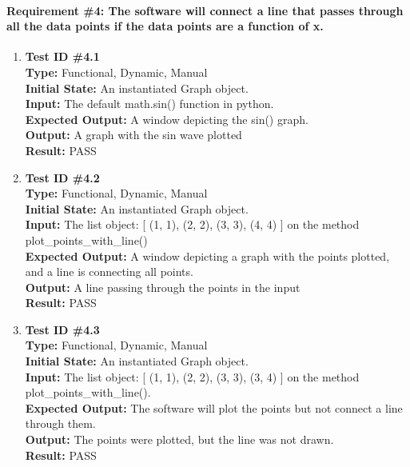 \documentclass[12pt, titlepage]{article}
\begin{document}
	\paragraph{Requirement \#4: The software will connect a line that passes through all the data points if the data points are a function of x.}
		\begin{enumerate}
			\item{\textbf{Test ID \#4.1\\}}
			\textbf{Type:} Functional, Dynamic, Manual\\
			\textbf{Initial State:} An instantiated Graph object. \\
			\textbf{Input:} The default math.sin() function in python.\\
			\textbf{Expected Output:}  A window depicting the sin() graph.\\
			\textbf{Output:}	A graph with the sin wave plotted\\
			\textbf{Result:} PASS
					
			\item{\textbf{Test ID \#4.2\\}}
			\textbf{Type:} Functional, Dynamic, Manual\\
			\textbf{Initial State:} An instantiated Graph object.\\
			\textbf{Input:} The list object: [ (1, 1),  (2, 2), (3, 3), (4, 4) ] on the method plot\_points\_with\_line()\\
			\textbf{Expected Output:} A window depicting a graph with the points plotted, and a line is connecting all points. \\
			\textbf{Output:}	A line passing through the points in the input\\
			\textbf{Result:} PASS
				
			\item{\textbf{Test ID \#4.3\\}}
			\textbf{Type:} Functional, Dynamic, Manual\\
			\textbf{Initial State:}  An instantiated Graph object.\\
			\textbf{Input:} The list object: [ (1, 1),  (2, 2), (3, 3), (3, 4) ] on the method plot\_points\_with\_line().\\
			\textbf{Expected Output:} The software will plot the points but not connect a line through them.\\
			\textbf{Output:}	The points were plotted, but the line was not drawn.\\
			\textbf{Result:} PASS
	\end{enumerate}
	
\end{document}
